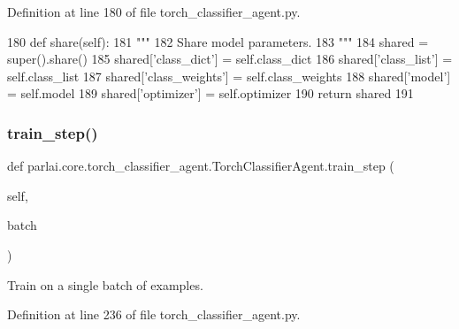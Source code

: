 Definition at line 180 of file torch\+\_\+classifier\+\_\+agent.\+py.


\begin{DoxyCode}
180     \textcolor{keyword}{def }share(self):
181         \textcolor{stringliteral}{"""}
182 \textcolor{stringliteral}{        Share model parameters.}
183 \textcolor{stringliteral}{        """}
184         shared = super().share()
185         shared[\textcolor{stringliteral}{'class\_dict'}] = self.class\_dict
186         shared[\textcolor{stringliteral}{'class\_list'}] = self.class\_list
187         shared[\textcolor{stringliteral}{'class\_weights'}] = self.class\_weights
188         shared[\textcolor{stringliteral}{'model'}] = self.model
189         shared[\textcolor{stringliteral}{'optimizer'}] = self.optimizer
190         \textcolor{keywordflow}{return} shared
191 
\end{DoxyCode}
\mbox{\label{classparlai_1_1core_1_1torch__classifier__agent_1_1TorchClassifierAgent_a3baacdb005c5f5a6367c45c93d21d398}} 
\subsubsection{\texorpdfstring{train\+\_\+step()}{train\_step()}}
{\footnotesize\ttfamily def parlai.\+core.\+torch\+\_\+classifier\+\_\+agent.\+Torch\+Classifier\+Agent.\+train\+\_\+step (\begin{DoxyParamCaption}\item[{}]{self,  }\item[{}]{batch }\end{DoxyParamCaption})}

\begin{DoxyVerb}Train on a single batch of examples.
\end{DoxyVerb}
 

Definition at line 236 of file torch\+\_\+classifier\+\_\+agent.\+py.


